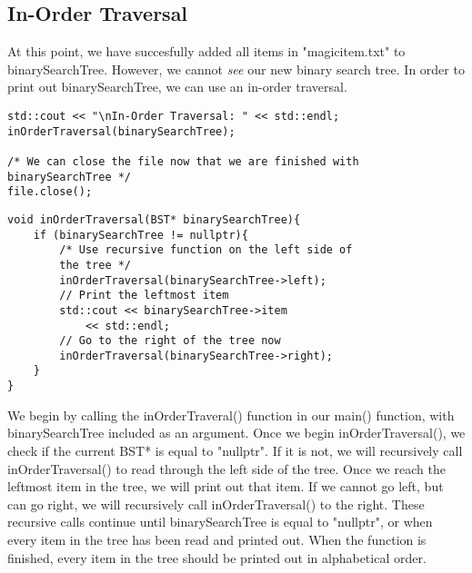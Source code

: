 \documentclass{article}
\begin{document}
\subsection{In-Order Traversal}
At this point, we have succesfully added all items in "magicitem.txt" to binarySearchTree. However, we cannot \textit{see} our new binary search tree. In order to print out binarySearchTree, we can use an in-order traversal. 
\begin{lstlisting}
std::cout << "\nIn-Order Traversal: " << std::endl;
inOrderTraversal(binarySearchTree);

/* We can close the file now that we are finished with 
binarySearchTree */
file.close();
\end{lstlisting}
\begin{lstlisting}
void inOrderTraversal(BST* binarySearchTree){
    if (binarySearchTree != nullptr){
        /* Use recursive function on the left side of 
        the tree */
        inOrderTraversal(binarySearchTree->left);
        // Print the leftmost item
        std::cout << binarySearchTree->item 
            << std::endl;
        // Go to the right of the tree now
        inOrderTraversal(binarySearchTree->right);
    }
}
\end{lstlisting}
We begin by calling the inOrderTraveral() function in our main() function, with binarySearchTree included as an argument. Once we begin inOrderTraversal(), we check if the current BST* is equal to "nullptr". If it is not, we will recursively call inOrderTraversal() to read through the left side of the tree. Once we reach the leftmost item in the tree, we will print out that item. If we cannot go left, but can go right, we will recursively call inOrderTraversal() to the right. These recursive calls continue until binarySearchTree is equal to "nullptr", or when every item in the tree has been read and printed out. When the function is finished, every item in the tree should be printed out in alphabetical order. 

\pagebreak
\end{document}
